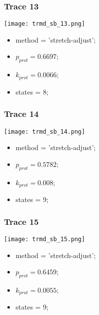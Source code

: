 \subsubsection{Trace 13}
\begin{minipage}[c]{0.7\textwidth}
    \texttt{[image: trmd\_sb\_13.png]}
\end{minipage}
\hfill
\begin{minipage}[c]{0.45\textwidth}
    \begin{itemize}
        \item method = 'stretch-adjust';
        \item $p_{prot}=0.6697$;
        \item $k_{prot}=0.0066$;
        \item states = 8;
    \end{itemize}
\end{minipage}

\subsubsection{Trace 14}
\begin{minipage}[c]{0.7\textwidth}
    \texttt{[image: trmd\_sb\_14.png]}
\end{minipage}
\hfill
\begin{minipage}[c]{0.45\textwidth}
    \begin{itemize}
        \item method = 'stretch-adjust';
        \item $p_{prot}=0.5782$;
        \item $k_{prot}=0.008$;
        \item states = 9;
    \end{itemize}
\end{minipage}

\subsubsection{Trace 15}
\begin{minipage}[c]{0.7\textwidth}
    \texttt{[image: trmd\_sb\_15.png]}
\end{minipage}
\hfill
\begin{minipage}[c]{0.45\textwidth}
    \begin{itemize}
        \item method = 'stretch-adjust';
        \item $p_{prot}=0.6459$;
        \item $k_{prot}=0.0055$;
        \item states = 9;
    \end{itemize}
\end{minipage}


